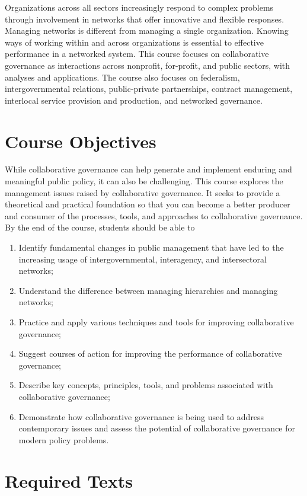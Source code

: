 \documentclass[12pt, letterpaper]{article}
\begin{document}
Organizations across all sectors increasingly respond to complex problems through involvement in networks that offer innovative and flexible responses. Managing networks is different from managing a single organization. Knowing ways of working within and across organizations is essential to effective performance in a networked system. This course focuses on collaborative governance as interactions across nonprofit, for-profit, and public sectors, with analyses and applications. The course also focuses on federalism, intergovernmental relations, public-private partnerships, contract management, interlocal service provision and production, and networked governance.

\section{Course Objectives}

While collaborative governance can help generate and implement enduring and meaningful public policy, it can also be challenging. This course explores the management issues raised by collaborative governance. It seeks to provide a theoretical and practical foundation so that you can become a better producer and consumer of the processes, tools, and approaches to collaborative governance. By the end of the course, students should be able to

\begin{enumerate}
    \item Identify fundamental changes in public management that have led to the increasing usage of intergovernmental, interagency, and intersectoral networks;
    \item Understand the difference between managing hierarchies and managing networks;
    \item Practice and apply various techniques and tools for improving collaborative governance;
    \item Suggest courses of action for improving the performance of collaborative governance;
    \item Describe key concepts, principles, tools, and problems associated with collaborative governance;
    \item Demonstrate how collaborative governance is being used to address contemporary issues and assess the potential of collaborative governance for modern policy problems. 
\end{enumerate}


\section{Required Texts}
\end{document}
